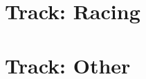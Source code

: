 \part{Track: Racing \label{part:track-field}}
\parttoc
\thispagestyle{empty}






\part{Track: Other \label{part:track-other}}
\parttoc
\thispagestyle{empty}





